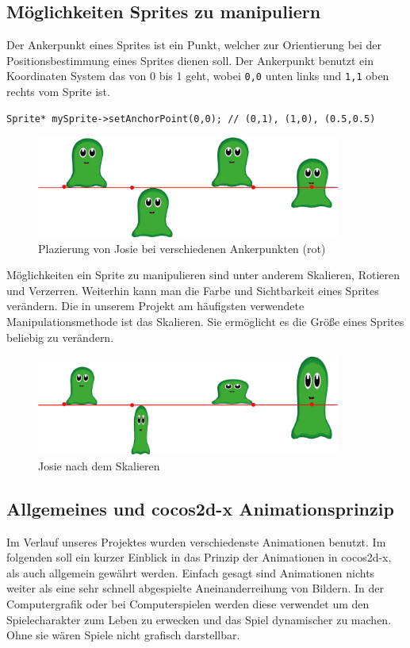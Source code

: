 \subsection{Möglichkeiten Sprites zu manipuliern}
Der Ankerpunkt eines Sprites ist ein Punkt, welcher zur Orientierung bei der Positionsbestimmung eines Sprites dienen soll. Der Ankerpunkt benutzt ein Koordinaten System das von 0 bis 1 geht, wobei \texttt{0,0} unten links und \texttt{1,1} oben rechts vom Sprite ist.

\begin{lstlisting}[style=singleline]
Sprite* mySprite->setAnchorPoint(0,0); // (0,1), (1,0), (0.5,0.5)
\end{lstlisting}

\begin{figure}[H]
  \centering
  \includegraphics[width=10cm]{resources/josiedoku3}
  \caption{Plazierung von Josie bei verschiedenen Ankerpunkten (rot)}
  \label{fig:josie_ancherpoint} 
\end{figure}

Möglichkeiten ein Sprite zu manipulieren sind unter anderem Skalieren, Rotieren und Verzerren. Weiterhin kann man die Farbe und Sichtbarkeit eines Sprites verändern. Die in unserem Projekt am häufigsten verwendete Manipulationsmethode ist das Skalieren. Sie ermöglicht es die Größe eines Sprites beliebig zu verändern.

\begin{figure}[H]
 \centering
  \includegraphics[width=10cm]{resources/josiedoku4}
  \caption{Josie nach dem Skalieren}
  \label{fig:josie_scale} 
\end{figure}



\label{sec:2_Animationsprinzip}

\subsection{Allgemeines und cocos2d-x Animationsprinzip}
Im Verlauf unseres Projektes wurden verschiedenste Animationen benutzt. Im folgenden soll ein kurzer Einblick in das Prinzip der Animationen in cocos2d-x, als auch allgemein gewährt werden. Einfach gesagt sind Animationen nichts weiter als eine sehr schnell abgespielte Aneinanderreihung von Bildern. In der Computergrafik oder bei Computerspielen werden diese verwendet um den Spielecharakter zum Leben zu erwecken und das Spiel dynamischer zu machen. Ohne sie wären Spiele nicht grafisch darstellbar.

